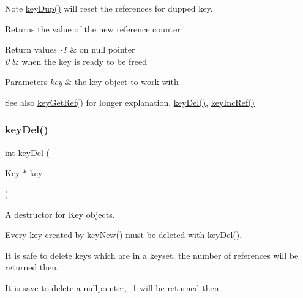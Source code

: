 \begin{DoxyNote}{Note}
\mbox{\hyperlink{group__key_gae6ec6a60cc4b8c1463fa08623d056ce3}{key\+Dup()}} will reset the references for dupped key.
\end{DoxyNote}
\begin{DoxyReturn}{Returns}
the value of the new reference counter 
\end{DoxyReturn}

\begin{DoxyRetVals}{Return values}
{\em -\/1} & on null pointer \\
\hline
{\em 0} & when the key is ready to be freed \\
\hline
\end{DoxyRetVals}

\begin{DoxyParams}{Parameters}
{\em key} & the key object to work with \\
\hline
\end{DoxyParams}
\begin{DoxySeeAlso}{See also}
\mbox{\hyperlink{group__key_ga4aabc4272506dd63161db2bbb42de8ae}{key\+Get\+Ref()}} for longer explanation, \mbox{\hyperlink{group__key_ga3df95bbc2494e3e6703ece5639be5bb1}{key\+Del()}}, \mbox{\hyperlink{group__key_ga6970a6f254d67af7e39f8e469bb162f1}{key\+Inc\+Ref()}} 
\end{DoxySeeAlso}
\mbox{\label{group__key_ga3df95bbc2494e3e6703ece5639be5bb1}} 
\subsubsection{\texorpdfstring{keyDel()}{keyDel()}}
{\footnotesize\ttfamily int key\+Del (\begin{DoxyParamCaption}\item[{Key $\ast$}]{key }\end{DoxyParamCaption})}



A destructor for Key objects. 

Every key created by \mbox{\hyperlink{group__key_gad23c65b44bf48d773759e1f9a4d43b89}{key\+New()}} must be deleted with \mbox{\hyperlink{group__key_ga3df95bbc2494e3e6703ece5639be5bb1}{key\+Del()}}.

It is safe to delete keys which are in a keyset, the number of references will be returned then.

It is save to delete a nullpointer, -\/1 will be returned then.

